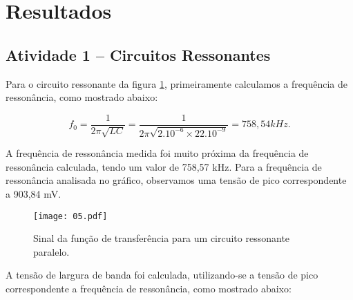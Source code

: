 \newpage
\section{Resultados}

\subsection{Atividade 1 – Circuitos Ressonantes}

Para o circuito ressonante da figura \ref{fig:Qload}, primeiramente calculamos 
a frequência de ressonância, como mostrado abaixo:

\[
  f_0 = \frac{1}{2 \pi \sqrt{LC}} = \frac{1}{2 \pi \sqrt{2.10^{-6} \times 
  22.10^{-9}}} = 758,54kHz.
\]

A frequência de ressonância medida foi muito próxima da frequência de 
ressonância calculada, tendo um valor de 758,57 kHz.
Para a frequência de ressonância analisada no gráfico, observamos uma tensão de 
pico correspondente a 903,84 mV.

\begin{figure}[H]
  \centering
  \caption{Sinal da função de transferência para um circuito ressonante 
  paralelo.}
  \texttt{[image: 05.pdf]}
  
  \label{fig:Qload}
\end{figure}

A tensão de largura de banda foi calculada, utilizando-se a tensão de pico 
correspondente a frequência de ressonância, como mostrado abaixo:
